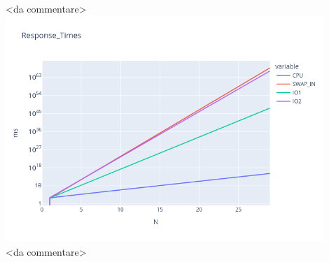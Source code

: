 \documentclass[12pt,a4paper]{article}
\begin{document}
    \\
    <da commentare>
    \\
    \includegraphics[width=0.9\textwidth]{Images/Response_Times.png}
    \\
    <da commentare>
    
\end{document}
